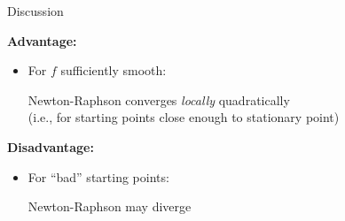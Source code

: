 \documentclass[11pt,compress,t,notes=noshow, xcolor=table]{beamer}
\begin{document}

\begin{vbframe}{Discussion}

\textbf{Advantage:}

\begin{itemize}
    \item For $f$ sufficiently smooth:
        \begin{framed}
            \centering
            Newton-Raphson converges \textit{locally} quadratically \\
            (i.e., for starting points close enough to stationary point)
        \end{framed}
\end{itemize}

\lz

\textbf{Disadvantage:}

\begin{itemize}
    \setlength{\itemsep}{1em}
    \item For \enquote{bad} starting points:
        \begin{framed}
            \centering
            Newton-Raphson may diverge
        \end{framed}
\end{itemize}

\end{vbframe}
\end{document}
